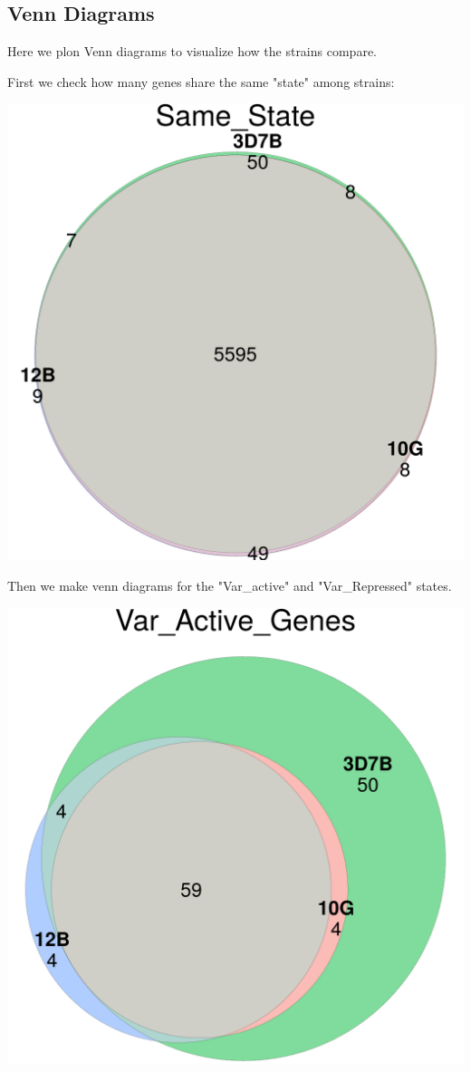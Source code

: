 \documentclass[11pt]{article}
\begin{document}
\subsection{Venn Diagrams}
\label{sec:org7d865df}
Here we plon Venn diagrams to visualize how the strains compare.

First we check how many genes share the same "state" among strains:

\begin{center}
\includegraphics[width=.9\linewidth]{./Plots/venn_Same_State.png}
\end{center}

Then we make venn diagrams for the "Var\_active" and "Var\_Repressed" states.

\begin{center}
\includegraphics[width=.9\linewidth]{./Plots/venn_Var_Active_Genes.png}
\end{center}
\end{document}
